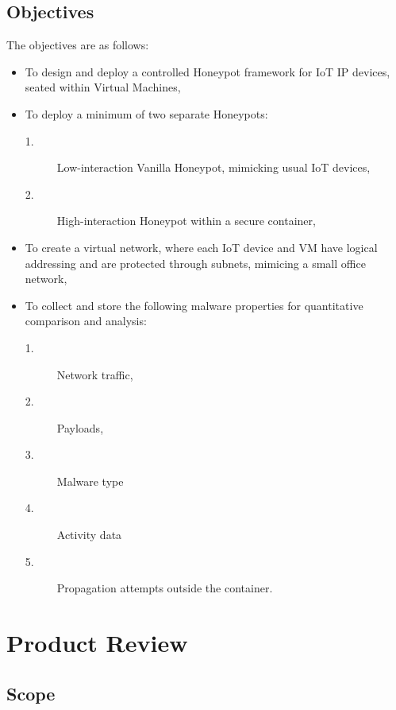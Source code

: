 \documentclass[a4paper,12pt,oneside]{book}			%
\begin{document}
\subsection{Objectives}\label{sec:objectives}
The objectives are as follows:
\begin{itemize}

	\item To design and deploy a controlled Honeypot framework for IoT IP devices, seated within Virtual Machines,
	\item To deploy a minimum of two separate Honeypots:
		\begin{description}
		\item[1.] Low-interaction Vanilla Honeypot, mimicking usual IoT devices, 
		\item[2.] High-interaction Honeypot within a secure container,
		\end{description}
	\item To create a virtual network, where each IoT device and VM have logical addressing and are protected through subnets, mimicing a small office network,
	\item To collect and store the following malware properties for quantitative comparison and analysis:
		\begin{description}
		\item[1.] Network traffic,
		\item[2.] Payloads,
		\item[3.] Malware type
		\item[4.] Activity data
		\item[5.] Propagation attempts outside the container.
		\end{description}
\end{itemize}

\section{Product Review}\label{sec:productReview}

\subsection{Scope}\label{sec:scope}

\end{document}
